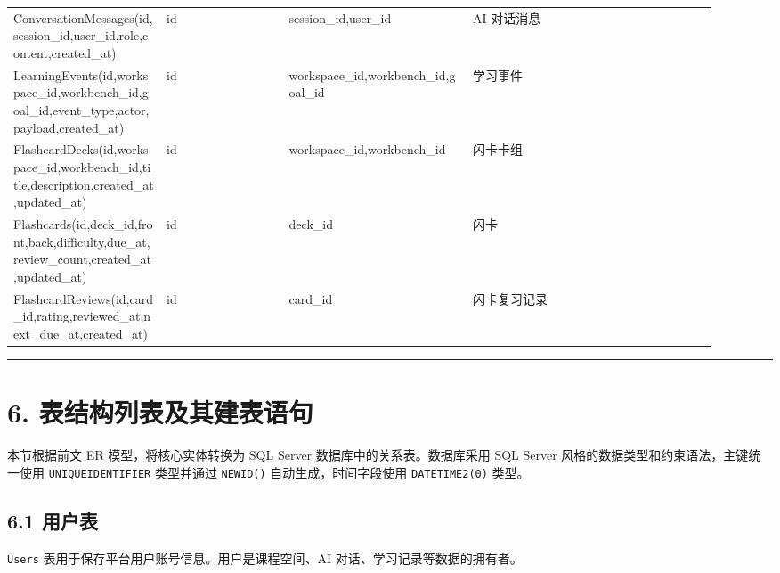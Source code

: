 \documentclass[10pt,a4paper,fontset=none]{ctexart}
\begin{document}
\begin{longtable}{>{\raggedright\arraybackslash}p{0.20\linewidth}>{\raggedright\arraybackslash}p{0.16\linewidth}>{\raggedright\arraybackslash}p{0.24\linewidth}>{\raggedright\arraybackslash}p{0.32\linewidth}}
ConversationMessages(id,session\_id,user\_id,role,content,created\_at) & id & session\_id,user\_id & AI 对话消息 \\
LearningEvents(id,workspace\_id,workbench\_id,goal\_id,event\_type,actor,payload,created\_at) & id & workspace\_id,workbench\_id,goal\_id & 学习事件 \\
FlashcardDecks(id,workspace\_id,workbench\_id,title,description,created\_at,updated\_at) & id & workspace\_id,workbench\_id & 闪卡卡组 \\
Flashcards(id,deck\_id,front,back,difficulty,due\_at,review\_count,created\_at,updated\_at) & id & deck\_id & 闪卡 \\
FlashcardReviews(id,card\_id,rating,reviewed\_at,next\_due\_at,created\_at) & id & card\_id & 闪卡复习记录 \\
\bottomrule
\end{longtable}
\endgroup


\bigskip\hrule\bigskip
\clearpage
\section*{6. 表结构列表及其建表语句}

本节根据前文 ER 模型，将核心实体转换为 SQL Server 数据库中的关系表。数据库采用 SQL Server 风格的数据类型和约束语法，主键统一使用 \texttt{UNIQUEIDENTIFIER} 类型并通过 \texttt{NEWID()} 自动生成，时间字段使用 \texttt{DATETIME2(0)} 类型。\par

\subsection*{6.1 用户表}

\texttt{Users} 表用于保存平台用户账号信息。用户是课程空间、AI 对话、学习记录等数据的拥有者。\par
\end{document}
